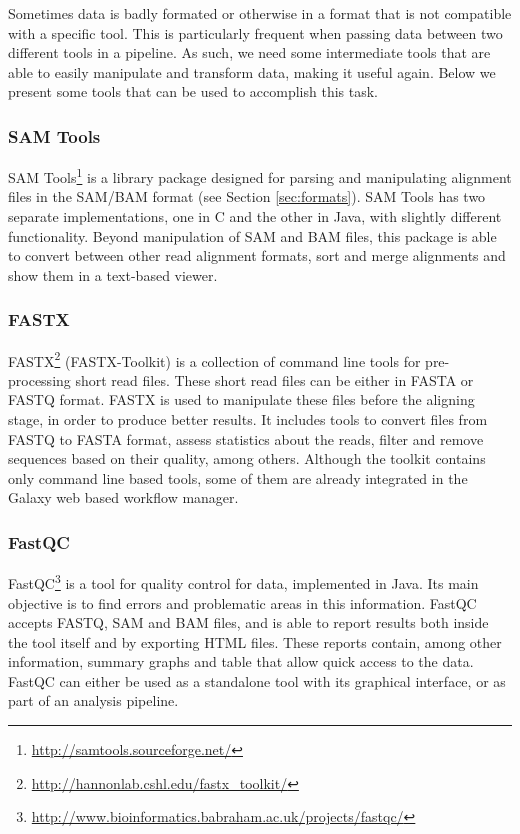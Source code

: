 Sometimes data is badly formated or otherwise in a format that is not compatible
with a specific tool. This is particularly frequent when passing data between
two different tools in a pipeline. As such, we need some intermediate tools that
are able to easily manipulate and transform data, making it useful again. Below
we present some tools that can be used to accomplish this task.

\subsubsection*{SAM Tools}

SAM Tools\footnote{\url{http://samtools.sourceforge.net/}} is a library
package designed for parsing and manipulating alignment files in the SAM/BAM
format \cite{Li2009} (see Section \ref{sec:formats}). SAM Tools has two separate
implementations, one in C and the other in Java, with slightly different
functionality. Beyond manipulation of SAM and BAM files, this package is able to
convert between other read alignment formats, sort and merge alignments and show
them in a text-based viewer.

\subsubsection*{FASTX}

FASTX\footnote{\url{http://hannonlab.cshl.edu/fastx_toolkit/}} (FASTX-Toolkit)
is a collection of command line tools for pre-processing short read files. These
short read files can be either in FASTA or FASTQ format. FASTX is used to
manipulate these files before the aligning stage, in order to produce better
results. It includes tools to convert files from FASTQ to FASTA format, assess
statistics about the reads, filter and remove sequences based on their quality,
among others. Although the toolkit contains only command line based tools, some
of them are already integrated in the Galaxy web based workflow manager.

\subsubsection*{FastQC}

FastQC\footnote{\url{http://www.bioinformatics.babraham.ac.uk/projects/fastqc/}}
is a tool for quality control for \ngs{} data, implemented in Java. Its main
objective is to find errors and problematic areas in this information. FastQC
accepts FASTQ, SAM and BAM files, and is able to report results both inside the
tool itself and by exporting HTML files. These reports contain, among other
information, summary graphs and table that allow quick access to the data.
FastQC can either be used as a standalone tool with its graphical interface, or
as part of an analysis pipeline.

